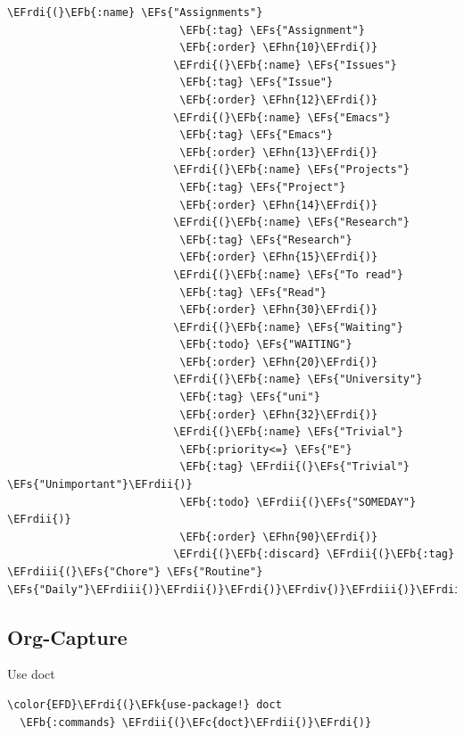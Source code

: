 \documentclass{scrartcl}
\newcommand{\EFk}[1]{\textcolor{EFk}{#1}} %
\newcommand{\EFs}[1]{\textcolor{EFs}{#1}} %
\newcommand{\EFb}[1]{\textcolor{EFb}{#1}} %
\newcommand{\EFc}[1]{\textcolor{EFc}{#1}} %
\newcommand{\EFhn}[1]{\textcolor{EFhn}{\textbf{#1}}} %
\newcommand{\EFrdi}[1]{\textcolor{EFrdi}{#1}} %
\newcommand{\EFrdii}[1]{\textcolor{EFrdii}{#1}} %
\newcommand{\EFrdiii}[1]{\textcolor{EFrdiii}{#1}} %
\newcommand{\EFrdiv}[1]{\textcolor{EFrdiv}{#1}} %
\begin{document}
\begin{Code}
\begin{Verbatim}[]
                          \EFrdi{(}\EFb{:name} \EFs{"Assignments"}
                           \EFb{:tag} \EFs{"Assignment"}
                           \EFb{:order} \EFhn{10}\EFrdi{)}
                          \EFrdi{(}\EFb{:name} \EFs{"Issues"}
                           \EFb{:tag} \EFs{"Issue"}
                           \EFb{:order} \EFhn{12}\EFrdi{)}
                          \EFrdi{(}\EFb{:name} \EFs{"Emacs"}
                           \EFb{:tag} \EFs{"Emacs"}
                           \EFb{:order} \EFhn{13}\EFrdi{)}
                          \EFrdi{(}\EFb{:name} \EFs{"Projects"}
                           \EFb{:tag} \EFs{"Project"}
                           \EFb{:order} \EFhn{14}\EFrdi{)}
                          \EFrdi{(}\EFb{:name} \EFs{"Research"}
                           \EFb{:tag} \EFs{"Research"}
                           \EFb{:order} \EFhn{15}\EFrdi{)}
                          \EFrdi{(}\EFb{:name} \EFs{"To read"}
                           \EFb{:tag} \EFs{"Read"}
                           \EFb{:order} \EFhn{30}\EFrdi{)}
                          \EFrdi{(}\EFb{:name} \EFs{"Waiting"}
                           \EFb{:todo} \EFs{"WAITING"}
                           \EFb{:order} \EFhn{20}\EFrdi{)}
                          \EFrdi{(}\EFb{:name} \EFs{"University"}
                           \EFb{:tag} \EFs{"uni"}
                           \EFb{:order} \EFhn{32}\EFrdi{)}
                          \EFrdi{(}\EFb{:name} \EFs{"Trivial"}
                           \EFb{:priority<=} \EFs{"E"}
                           \EFb{:tag} \EFrdii{(}\EFs{"Trivial"} \EFs{"Unimportant"}\EFrdii{)}
                           \EFb{:todo} \EFrdii{(}\EFs{"SOMEDAY"} \EFrdii{)}
                           \EFb{:order} \EFhn{90}\EFrdi{)}
                          \EFrdi{(}\EFb{:discard} \EFrdii{(}\EFb{:tag} \EFrdiii{(}\EFs{"Chore"} \EFs{"Routine"} \EFs{"Daily"}\EFrdiii{)}\EFrdii{)}\EFrdi{)}\EFrdiv{)}\EFrdiii{)}\EFrdii{)}\EFrdi{)}\EFrdiv{)}\EFrdiii{)}\EFrdii{)}\EFrdi{)}
\end{Verbatim}
\end{Code}

\subsection{Org-Capture}
\label{sec:org50a0e14}
Use doct
\begin{Code}
\begin{Verbatim}[]
\color{EFD}\EFrdi{(}\EFk{use-package!} doct
  \EFb{:commands} \EFrdii{(}\EFc{doct}\EFrdii{)}\EFrdi{)}
\end{Verbatim}
\end{Code}
\end{document}
